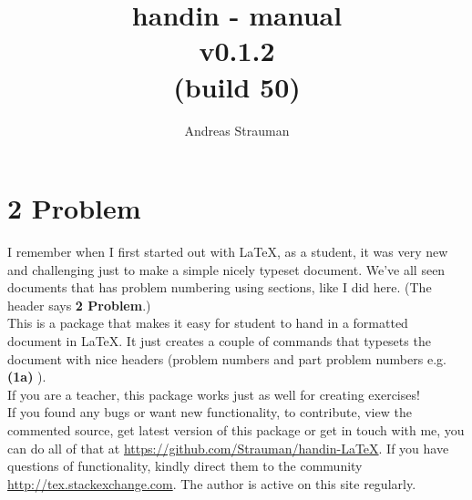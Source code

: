 \documentclass[a4paper]{article}
\title{{handin - manual\\ v0.1.2{\\[-0.5em]\footnotesize(build 50)}}}
\author{Andreas Strauman}
\let\oldTOC\tableofcontents
\renewcommand\tableofcontents{\hypersetup{linkcolor=black}\oldTOC\hypersetup{linkcolor=Definition}}
\let\oldsection\section
\gdef\section{\needspace{0.3\paperheight}\oldsection}
\begin{document}
\maketitle
\section*{2 Problem}
I remember when I first started out with LaTeX, as a student, it was very new and challenging just to make a simple nicely typeset document. We've all seen documents that has problem numbering using sections, like I did here. (The header says \textbf{2 Problem}.)\\

This is a package that makes it easy for student to hand in a formatted document in LaTeX. It just creates a couple of commands that typesets the document with nice headers (problem numbers and part problem numbers e.g. \textbf{(1a)} ).\\

If you are a teacher, this package works just as well for creating exercises!\\
 
If you found any bugs or want new functionality, to contribute, view the commented source, get latest version of this package or get in touch with me, you can do all of that at \url{https://github.com/Strauman/handin-LaTeX}. If you have questions of functionality, kindly direct them to the community\\ \url{http://tex.stackexchange.com}. The author is active on this site regularly.

\tableofcontents
\clearpage
\end{document}
